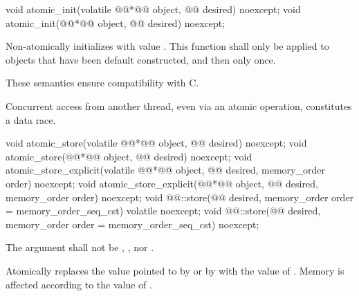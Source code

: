 \begin{itemdecl}
void atomic_init(volatile @@*@\itcorr[-1]@ object, @@ desired) noexcept;
void atomic_init(@@*@\itcorr[-1]@ object, @@ desired) noexcept;
\end{itemdecl}

\begin{itemdescr}
\pnum
\effects Non-atomically
initializes  with value . This function shall only be applied
to objects that have been default constructed, and then only once.
\begin{note}
These semantics ensure compatibility with C.
\end{note}
\begin{note}
Concurrent access from another thread, even via an atomic operation, constitutes
a data race.
\end{note}

\end{itemdescr}

%
%
%
\begin{itemdecl}
void atomic_store(volatile @@*@\itcorr[-1]@ object, @@ desired) noexcept;
void atomic_store(@@*@\itcorr[-1]@ object, @@ desired) noexcept;
void atomic_store_explicit(volatile @@*@\itcorr[-1]@ object, @@ desired, memory_order order) noexcept;
void atomic_store_explicit(@@*@\itcorr[-1]@ object, @@ desired, memory_order order) noexcept;
void @@::store(@@ desired, memory_order order = memory_order_seq_cst) volatile noexcept;
void @@::store(@@ desired, memory_order order = memory_order_seq_cst) noexcept;
\end{itemdecl}

\begin{itemdescr}
\pnum
\requires The  argument shall not be ,
, nor .

\pnum
\effects Atomically replaces the value pointed to by  or by 
with the value of . Memory is affected according to the value of
.
\end{itemdescr}

